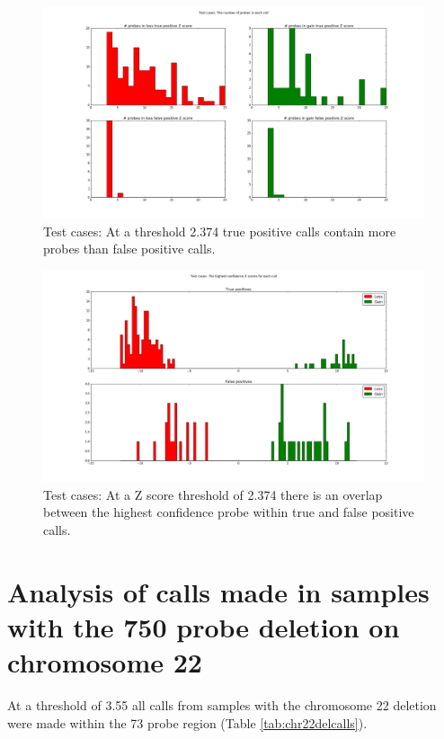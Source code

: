 \begin{figure}
\centering
\includegraphics[width=1\linewidth]{./Figures/testcasesprobecount}
\caption[Test cases: The number of probes within calls made at a threshold of 2.374]{Test cases: At a threshold 2.374 true positive calls contain more probes than false positive calls.}
\label{fig:testcasesprobecount}
\end{figure}

\begin{figure}
\centering
\includegraphics[width=1\linewidth]{./Figures/testcaseshighestconfidenceZscore}
\caption[Test cases: The highest confidence probe within calls made at a threshold of 2.374]{Test cases: At a Z score threshold of 2.374 there is an overlap between the highest confidence probe within true and false positive calls.}
\label{fig:testcaseshighestconfidenceZscore}
\end{figure}


\section{Analysis of calls made in samples with the 750 probe deletion on chromosome 22}\label{ch:analysisof22del}
At a threshold of 3.55 all calls from samples with the chromosome 22 deletion were made within the 73 probe region (Table  \ref{tab:chr22delcalls}).


